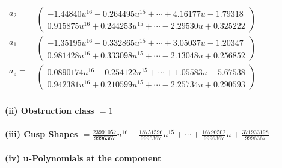 \documentclass[1p]{elsarticle_modified}
\theoremstyle{definition}
\begin{document}
\begin{tabular}{m{7pt} m{180pt} m{7pt} m{180pt} }
\flushright $a_{2}=$&$\begin{pmatrix}-1.44840 u^{16}-0.264495 u^{15}+\cdots+4.16177 u-1.79318\\0.915875 u^{16}+0.244253 u^{15}+\cdots-2.29530 u+0.325222\end{pmatrix}$ \\
\flushright $a_{1}=$&$\begin{pmatrix}-1.35195 u^{16}-0.332865 u^{15}+\cdots+3.05037 u-1.20347\\0.981428 u^{16}+0.333098 u^{15}+\cdots-2.13048 u+0.256852\end{pmatrix}$ \\
\flushright $a_{9}=$&$\begin{pmatrix}0.0890174 u^{16}-0.254122 u^{15}+\cdots+1.05583 u-5.67538\\0.942381 u^{16}+0.210599 u^{15}+\cdots-2.25734 u+0.290593\end{pmatrix}$\\&\end{tabular}
\flushleft \textbf{(ii) Obstruction class $= 1$}\\~\\
\flushleft \textbf{(iii) Cusp Shapes $= \frac{23991057}{9996367} u^{16}+\frac{18751596}{9996367} u^{15}+\cdots+\frac{16790502}{9996367} u+\frac{371933198}{9996367}$}\\~\\
\newpage\renewcommand{\arraystretch}{1}
\flushleft \textbf{(iv) u-Polynomials at the component}\newline \\
\end{document}
